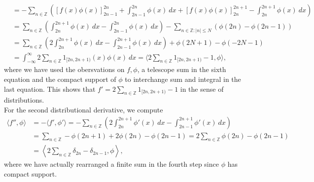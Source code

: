 \documentclass[11pt]{article}
\begin{document}
\begin{solution}
\begin{align*}
        &= - \sum_{n \in \mathbb{Z}} \left( [f(x) \phi(x)]_{2n - 1}^{2n} + \int_{2n - 1}^{2n} \phi(x) \ dx + [f(x) \phi(x)]_{2n}^{2n+1} - \int_{2n}^{2n + 1} \phi(x)  \ dx \right) \\
        &= \sum_{n \in \mathbb{Z}} \left( \int_{2n}^{2n + 1} \phi(x) \ dx - \int_{2n - 1}^{2n} \phi(x) \ dx \right) - \sum_{n \in \mathbb{Z}: |n| \leq N} \left( \phi(2n) - \phi(2n - 1) \right) \\
        & = \sum_{n \in \mathbb{Z}} \left( 2\int_{2n}^{2n + 1} \phi(x) \ dx - \int_{2n - 1}^{2n+1} \phi(x) \ dx \right) + \phi(2N + 1)  - \phi(-2N -1) \\
        & = \int_{-\infty}^{\infty} 2 \sum_{n \in \mathbb{Z}} 1_{[2n, 2n + 1)}(x) \phi(x) \ dx  = \langle 2 \sum_{n \in \mathbb{Z}} 1_{[2n, 2n + 1)} - 1, \phi \rangle,
    \end{align*}
    where we have used the obersvations on $f, \phi$, a telescope sum in the sixth equation and the compact support of $\phi$ to interchange sum and integral in the last equation. This shows that $f' = 2 \sum_{n \in \mathbb{Z}} 1_{[2n, 2n + 1)} - 1$ in the sense of distributions.\\

    For the second distributional derivative, we compute
    \begin{align}
        \langle f'', \phi \rangle &= - \langle f', \phi' \rangle 
        = -\sum_{n \in \mathbb{Z}} \left( 2 \int_{2n}^{2n + 1} \phi'(x) \ dx  - \int_{2n - 1}^{2n + 1} \phi'(x) \ dx \right) \\
        &= \sum_{n \in \mathbb{Z}} - \phi(2 n + 1) +  2\phi(2n) - \phi(2n-1) = 2 \sum_{n \in \mathbb{Z}} \phi(2n) - \phi(2n - 1)\\
        & = \left \langle 2 \sum_{n \in \mathbb{Z}} \delta_{2n}  - \delta_{2n - 1}, \phi \right \rangle,
    \end{align}
    where we have actually rearranged a finite sum in the fourth step since $\phi$ has compact support.
\end{solution}
\end{document}
